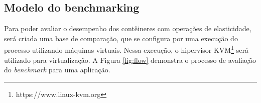 \documentclass[twoside,english,brazilian]{UNISINOSartigo}
\begin{document}

\subsection{Modelo do benchmarking}

Para poder avaliar o desempenho dos contêineres com operações de elasticidade, será criada uma base de comparação, que se configura por uma execução do processo utilizando máquinas virtuais. Nessa execução, o hipervisor KVM\footnote{https://www.linux-kvm.org} será utilizado para virtualização. A Figura \ref{fig:flow} demonstra o processo de avaliação do \textit{benchmark} para uma aplicação.
\end{document}
